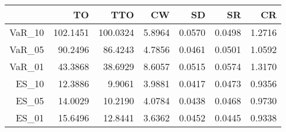\begin{tabular}{rrrrrrr}
  \toprule
 & TO & TTO & CW & SD & SR & CR \\ 
  \midrule
VaR\_10 & 102.1451 & 100.0324 & 5.8964 & 0.0570 & 0.0498 & 1.2716 \\ 
  VaR\_05 & 90.2496 & 86.4243 & 4.7856 & 0.0461 & 0.0501 & 1.0592 \\ 
  VaR\_01 & 43.3868 & 38.6929 & 8.6057 & 0.0515 & 0.0574 & 1.3170 \\ 
  ES\_10 & 12.3886 & 9.9061 & 3.9881 & 0.0417 & 0.0473 & 0.9356 \\ 
  ES\_05 & 14.0029 & 10.2190 & 4.0784 & 0.0438 & 0.0468 & 0.9730 \\ 
  ES\_01 & 15.6496 & 12.8441 & 3.6362 & 0.0452 & 0.0445 & 0.9338 \\ 
   \bottomrule
\end{tabular}

